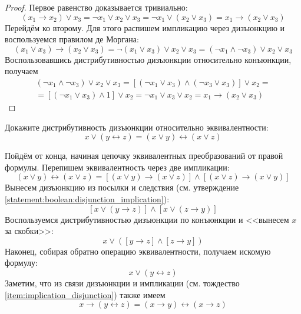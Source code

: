 \begin{proof}
    Первое равенство доказывается тривиально:
    \[
        (x_1 \rightarrow x_2) \vee x_3 = \neg x_1 \vee x_2 \vee x_3 = \neg x_1 \vee (x_2 \vee x_3) = x_1 \rightarrow (x_2 \vee x_3)
    \]
    Перейдём ко второму.
    Для этого распишем импликацию через дизъюнкцию и воспользуемся правилом де Моргана:
    \[
        (x_1 \vee x_3) \rightarrow (x_2 \vee x_3) =
        \neg (x_1 \vee x_3) \vee x_2 \vee x_3 =
        (\neg x_1 \wedge \neg x_3) \vee x_2 \vee x_3
    \]
    Воспользовавшись дистрибутивностью дизъюнкции относительно конъюнкции, получаем
    \begin{multline*}
        (\neg x_1 \wedge \neg x_3) \vee x_2 \vee x_3 =
        \left[ (\neg x_1 \vee x_3) \wedge (\neg x_3 \vee x_3) \right] \vee x_2 = \\ =
        \left[ (\neg x_1 \vee x_3) \wedge 1 \right] \vee x_2 =
        \neg x_1 \vee x_3 \vee x_2 =
        x_1 \rightarrow (x_2 \vee x_3)
    \end{multline*}
\end{proof}

\begin{Exercise}[counter=SecExercise, label={ex:boolean:disjunction_distributivity_over_equivalence}]
    \noindent
    Докажите дистрибутивность дизъюнкции относительно эквивалентности:
    \[
        x \vee (y \leftrightarrow z) = (x \vee y) \leftrightarrow (x \vee z)
    \]
\end{Exercise}

\begin{Answer}
    \noindent
    Пойдём от конца, начиная цепочку эквивалентных преобразований от правой формулы.
    Перепишем эквивалентность через две импликации:
    \[
        (x \vee y) \leftrightarrow (x \vee z) = \left[ (x \vee y) \rightarrow (x \vee z) \right] \wedge \left[ (x \vee z) \rightarrow (x \vee y) \right]
    \]
    Вынесем дизъюнкцию из посылки и следствия (см. утверждение \ref{statement:boolean:disjunction_implication}):
    \[
        \left[ x \vee \left( y \rightarrow z \right) \right] \wedge \left[ x \vee \left( z \rightarrow y \right) \right]
    \]
    Воспользуемся дистрибутивностью дизъюнкции по конъюнкции и <<вынесем $ x $ за скобки>>:
    \[
        x \vee \left( \left[ y \rightarrow z \right] \wedge \left[ z \rightarrow y \right] \right)
    \]
    Наконец, собирая обратно операцию эквивалентности, получаем искомую формулу:
    \[
        x \vee (y \leftrightarrow z)
    \]
    Заметим, что из связи дизъюнкции и импликации (см. тождество \ref{item:implication_disjunction}) также имеем
    \[
        x \rightarrow (y \leftrightarrow z) = (x \rightarrow y) \leftrightarrow (x \rightarrow z)
    \]
\end{Answer}


